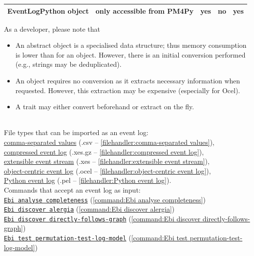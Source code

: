 {\begin{tabularx}{\linewidth}{XXccc}
            EventLogPython object & only accessible from PM4Py & yes & no & yes \\
            \bottomrule
        \end{tabularx}
        As a developer, please note that 
        \begin{itemize}
            \item An abstract object is a specialised data structure; thus memory consumption is lower than for an object. 
            However, there is an initial conversion performed (e.g., strings may be deduplicated).
            \item An object requires no conversion as it extracts necessary information when requested.
            However, this extraction may be expensive (especially for Ocel).
            \item A trait may either convert beforehand or extract on the fly.
        \end{itemize}~
\\File types that can be imported as an event log: \\\null\qquad\hyperref[filehandler:comma-separated values]{comma-separated values} (.csv -- \cref{filehandler:comma-separated values}), \\\null\qquad\hyperref[filehandler:compressed event log]{compressed event log} (.xes.gz -- \cref{filehandler:compressed event log}), \\\null\qquad\hyperref[filehandler:extensible event stream]{extensible event stream} (.xes -- \cref{filehandler:extensible event stream}), \\\null\qquad\hyperref[filehandler:object-centric event log]{object-centric event log} (.ocel -- \cref{filehandler:object-centric event log}), \\\null\qquad\hyperref[filehandler:Python event log]{Python event log} (.pel -- \cref{filehandler:Python event log}).
\\Commands that accept an event log as input: \\\null\qquad\hyperref[command:Ebi analyse completeness]{\texttt{Ebi analyse completeness}} (\cref{command:Ebi analyse completeness})\\\null\qquad\hyperref[command:Ebi discover alergia]{\texttt{Ebi discover alergia}} (\cref{command:Ebi discover alergia})\\\null\qquad\hyperref[command:Ebi discover directly-follows-graph]{\texttt{Ebi discover directly-follows-graph}} (\cref{command:Ebi discover directly-follows-graph})\\\null\qquad\hyperref[command:Ebi test permutation-test-log-model]{\texttt{Ebi test permutation-test-log-model}} (\cref{command:Ebi test permutation-test-log-model})
}
